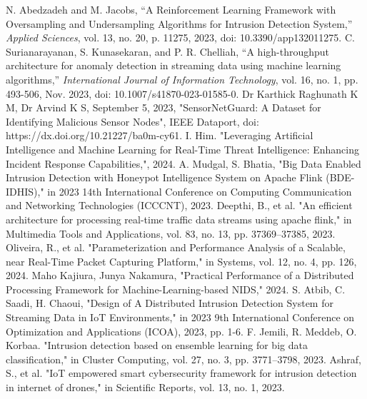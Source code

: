 \documentclass[runningheads]{llncs}
\begin{document}
%
%
%
% 
% 
%
\begin{thebibliography}{8}

 N. Abedzadeh and M. Jacobs, ``A Reinforcement Learning Framework with Oversampling and Undersampling Algorithms for Intrusion Detection System,'' \textit{Applied Sciences}, vol. 13, no. 20, p. 11275, 2023, doi: 10.3390/app132011275.
 C. Surianarayanan, S. Kunasekaran, and P. R. Chelliah, ``A high-throughput architecture for anomaly detection in streaming data using machine learning algorithms,'' \textit{International Journal of Information Technology}, vol. 16, no. 1, pp. 493-506, Nov. 2023, doi: 10.1007/s41870-023-01585-0.
 Dr Karthick Raghunath K M, Dr Arvind K S, September 5, 2023, "SensorNetGuard: A Dataset for Identifying Malicious Sensor Nodes", IEEE Dataport, doi: https://dx.doi.org/10.21227/ba0m-cy61.
 I. Him. "Leveraging Artificial Intelligence and Machine Learning for Real-Time Threat Intelligence: Enhancing Incident Response Capabilities,", 2024.
 A. Mudgal, S. Bhatia, "Big Data Enabled Intrusion Detection with Honeypot Intelligence System on Apache Flink (BDE-IDHIS)," in 2023 14th International Conference on Computing Communication and Networking Technologies (ICCCNT), 2023.
 Deepthi, B., et al. "An efficient architecture for processing real-time traffic data streams using apache flink," in Multimedia Tools and Applications, vol. 83, no. 13, pp. 37369–37385, 2023.
 Oliveira, R., et al. "Parameterization and Performance Analysis of a Scalable, near Real-Time Packet Capturing Platform," in Systems, vol. 12, no. 4, pp. 126, 2024.
 Maho Kajiura, Junya Nakamura, "Practical Performance of a Distributed Processing Framework for Machine-Learning-based NIDS," 2024.
 S. Atbib, C. Saadi, H. Chaoui, "Design of A Distributed Intrusion Detection System for Streaming Data in IoT Environments," in 2023 9th International Conference on Optimization and Applications (ICOA), 2023, pp. 1-6.
 F. Jemili, R. Meddeb, O. Korbaa. "Intrusion detection based on ensemble learning for big data classification," in Cluster Computing, vol. 27, no. 3, pp. 3771–3798, 2023.
 Ashraf, S., et al. "IoT empowered smart cybersecurity framework for intrusion detection in internet of drones," in Scientific Reports, vol. 13, no. 1, 2023.

\end{thebibliography}
\end{document}
